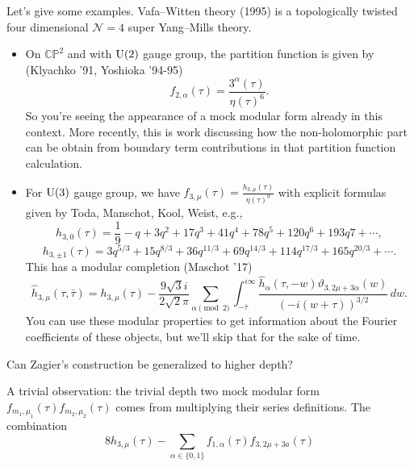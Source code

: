 \documentclass[reqno]{amsart} 
\numberwithin{theorem}{section}
\numberwithin{equation}{section}
\begin{document}
Let's give some examples.  Vafa--Witten theory (1995) is a topologically twisted four dimensional $\mathcal{N} = 4$ super Yang--Mills theory.
\begin{itemize}
\item On $\mathbb{C} \mathbb{P}^2$ and with $\operatorname{U}(2)$ gauge group, the partition function is given by (Klyachko '91, Yoshioka '94-95)
  \begin{equation*}
    f_{2, \alpha}(\tau) = \frac{3^\alpha(\tau)}{ \eta(\tau)^6}.
  \end{equation*}
  So you're seeing the appearance of a mock modular form already in this context.  More recently, this is work discussing how the non-holomorphic part can be obtain from boundary term contributions in that partition function calculation.
\item For $\operatorname{U}(3)$ gauge group, we have $f_{3, \mu}(\tau) = \frac{h_{3, \mu}(\tau)}{\eta(\tau)^9}$ with explicit formulas given by Toda, Manschot, Kool, Weist, e.g.,
  \begin{equation*}
    h_{3, 0}(\tau) = \frac{1}{9} - q + 3 q^2 + 1 7 q^3 + 41 q^4 + 78 q^5 + 120 q^6 + 193 q 7 + \dotsb,
  \end{equation*}
  \begin{equation*}
    h_{3, \pm 1}(\tau) = 3 q^{5/3} + 15 q^{8/3} + 36 q^{11/3} + 69 q^{14/3} + 114 q^{17/3} + 165 q^{20/3} + \dotsb.
  \end{equation*}
  This has a modular completion (Maschot '17)
  \begin{equation*}
    \hat{h}_{3, \mu}(\tau, \bar{\tau}) = h_{3, \mu}(\tau) - \frac{9 \sqrt{3} i}{2 \sqrt{2} \pi}
    \sum_{\alpha \pmod{2}}
    \int_{- \bar{\tau}}^{i \infty}
    \frac{\hat{h}_\alpha(\tau, - w)
      \vartheta_{3, 2 \mu + 3 \alpha}(w)}{\left( - i(w + \tau) \right)^{3/2}} \, d w.
  \end{equation*}
  You can use these modular properties to get information about the Fourier coefficients of these objects, but we'll skip that for the sake of time.
\end{itemize}
\begin{question}
  Can Zagier's construction be generalized to higher depth?
\end{question}
A trivial observation: the trivial depth two mock modular form $f_{m_1, \mu_1}(\tau) f_{m_2, \mu_2}(\tau)$ comes from multiplying their series definitions.  The combination
\begin{equation*}
  8 h_{3, \mu}(\tau) - \sum_{\alpha \in \{0, 1\}}
  f_{1, \alpha}(\tau) f_{3, 2 \mu + 3 a}(\tau)
\end{equation*}
\end{document}
